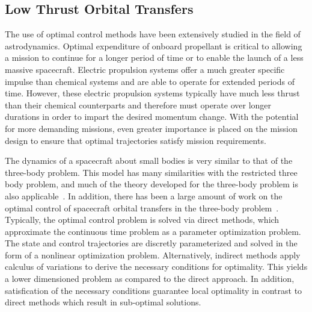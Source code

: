\subsection{Low Thrust Orbital Transfers}

The use of optimal control methods have been extensively studied in the field of astrodynamics.
Optimal expenditure of onboard propellant is critical to allowing a mission to continue for a longer period of time or to enable the launch of a less massive spacecraft.
Electric propulsion systems offer a much greater specific impulse than chemical systems and are able to operate for extended periods of time.
However, these electric propulsion systems typically have much less thrust than their chemical counterparts and therefore must operate over longer durations in order to impart the desired momentum change.
With the potential for more demanding missions, even greater importance is placed on the mission design to ensure that optimal trajectories satisfy mission requirements. 

The dynamics of a spacecraft about small bodies is very similar to that of the three-body problem.
This model has many similarities with the restricted three body problem, and much of the theory developed for the three-body problem is also applicable~\cite{mondelo2010,herrera2014}.
In addition, there has been a large amount of work on the optimal control of spacecraft orbital transfers in the three-body problem~\cite{mingotti2011,grebow2011}.
Typically, the optimal control problem is solved via direct methods, which approximate the continuous time problem as a parameter optimization problem.
The state and control trajectories are discretly parameterized and solved in the form of a nonlinear optimization problem.
Alternatively, indirect methods apply calculus of variations to derive the necessary conditions for optimality. 
This yields a lower dimensioned problem as compared to the direct approach.
In addition, satisfication of the necessary conditions guarantee local optimality in contrast to direct methods which result in sub-optimal solutions.


